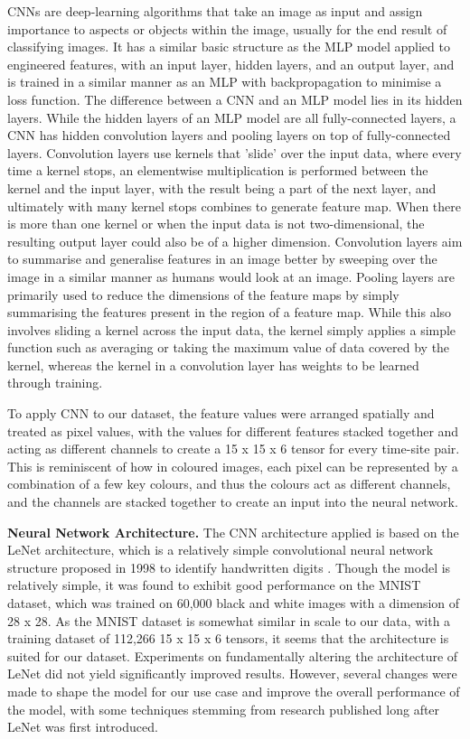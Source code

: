 \documentclass[a4paper,11pt]{report}
\begin{document}
CNNs are deep-learning algorithms that take an image as input and assign importance to aspects or objects within the image, usually for the end result of classifying images. It has a similar basic structure as the MLP model applied to engineered features, with an input layer, hidden layers, and an output layer, and is trained in a similar manner as an MLP with backpropagation to minimise a loss function. The difference between a CNN and an MLP model lies in its hidden layers. While the hidden layers of an MLP model are all fully-connected layers, a CNN has hidden convolution layers and pooling layers on top of fully-connected layers. Convolution layers use kernels that 'slide' over the input data, where every time a kernel stops, an elementwise multiplication is performed between the kernel and the input layer, with the result being a part of the next layer, and ultimately with many kernel stops combines to generate feature map. When there is more than one kernel or when the input data is not two-dimensional, the resulting output layer could also be of a higher dimension. Convolution layers aim to summarise and generalise features in an image better by sweeping over the image in a similar manner as humans would look at an image. Pooling layers are primarily used to reduce the dimensions of the feature maps by simply summarising the features present in the region of a feature map. While this also involves sliding a kernel across the input data, the kernel simply applies a simple function such as averaging or taking the maximum value of data covered by the kernel, whereas the kernel in a convolution layer has weights to be learned through training. 

To apply CNN to our dataset, the feature values were arranged spatially and treated as pixel values, with the values for different features stacked together and acting as different channels to create a 15 x 15 x 6 tensor for every time-site pair. This is reminiscent of how in coloured images, each pixel can be represented by a combination of a few key colours, and thus the colours act as different channels, and the channels are stacked together to create an input into the neural network. 

\textbf{Neural Network Architecture.} The CNN architecture applied is based on the LeNet architecture, which is a relatively simple convolutional neural network structure proposed in 1998 to identify handwritten digits \citep{lecun1998gradient}. Though the model is relatively simple, it was found to exhibit good performance on the MNIST dataset, which was trained on 60,000 black and white images with a dimension of 28 x 28. As the MNIST dataset is somewhat similar in scale to our data, with a training dataset of 112,266 15 x 15 x 6 tensors, it seems that the architecture is suited for our dataset. Experiments on fundamentally altering the architecture of LeNet did not yield significantly improved results. However, several changes were made to shape the model for our use case and improve the overall performance of the model, with some techniques stemming from research published long after LeNet was first introduced. 
\end{document}
